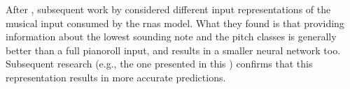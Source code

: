 

After \textcite{chen2018functional}, subsequent work by
\textcite{micchi2020not} considered different input
representations of the musical input consumed by the
\glspl{rna} model. What they found is
that providing information about the lowest sounding note
and the pitch classes is generally better than a full
pianoroll input, and results in a smaller neural network
too. Subsequent research (e.g., the one presented in this
\thesisdiss{}) confirms that this representation results in
more accurate predictions.
